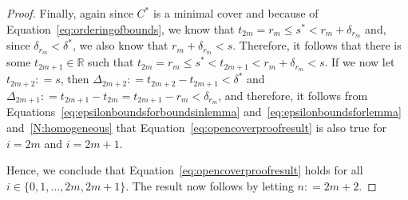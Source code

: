 \documentclass[10pt,a4paper]{paper}
\theoremstyle{definition}
\newcommand{\reals}{\mathbb{R}}
\newcommand{\rateset}{\mathcal{Q}}
\newcommand{\norm}[1]{\left\lVert #1 \right\rVert}
\newcommand{\coloneqq}{:\!=}
\begin{document}
\begin{proof}
Finally, again since $C^*$ is a minimal cover and because of Equation~\eqref{eq:orderingofbounds}, we know that $t_{2m}=r_m\leq s^*<r_m+\delta_{r_m}$ and, since $\delta_{r_m}<\delta^*$, we also know that $r_m+\delta_{r_m}<s$. Therefore, it follows that there is some $t_{2m+1}\in\reals$ such that $t_{2m}=r_m\leq s^*<t_{2m+1}<r_m+\delta_{r_m}<s$. If we now let $t_{2m+2}\coloneqq s$, then $\Delta_{2m+2}\coloneqq t_{2m+2}-t_{2m+1}<\delta^*$ and $\Delta_{2m+1}\coloneqq t_{2m+1}-t_{2m}=t_{2m+1}-r_m<\delta_{r_m}$, and therefore, it follows from Equations~\eqref{eq:epsilonboundsforboundsinlemma} and~\eqref{eq:epsilonboundsforlemma} and~\ref{N:homogeneous} that Equation~\eqref{eq:opencoverproofresult} is also true for $i=2m$ and $i=2m+1$.

Hence, we conclude that Equation~\eqref{eq:opencoverproofresult} holds for all $i\in\{0,1,\dots,2m,2m+1\}$. The result now follows by letting $n\coloneqq2m+2$.
\end{proof}



\end{document}
